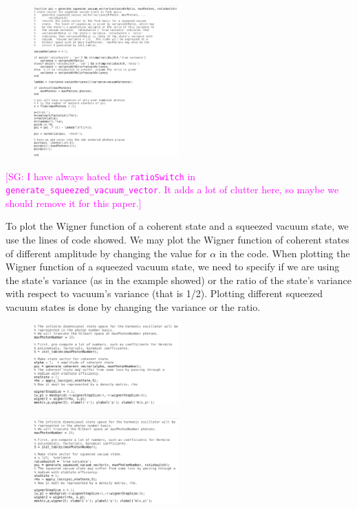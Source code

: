 \documentclass[twocolumn]{rbef}
\providecommand{\aucmnt}[1]{#1}
\providecommand{\editcolor}[2]{\textcolor{#1}{#2}}
\providecommand{\aucmnt}[1]{}
\providecommand{\editcolor}[2]{#2}
\newcommand{\SGc}[1]{\aucmnt{\editcolor{magenta}{[SG: #1]}}}
\begin{document}
\begin{figure}[h]
\includegraphics[width=0.5\textwidth]{generate_squeezed_vacuum_vector.eps}
\end{figure}
\SGc{I have always hated the \texttt{ratioSwitch} in
  \texttt{generate\_squeezed\_vacuum\_vector}.  It adds a lot of
  clutter here, so maybe we should remove it for this paper.}

To plot the Wigner function of a coherent state and a squeezed vacuum state, we use the lines of code showed. We may plot the Wigner function of coherent states of different amplitude by changing the value for $\alpha$ in the code. When plotting the Wigner function of a squeezed vacuum state, we need to specify if we are using the state's variance (as in the example showed) or the ratio of the state's variance with
respect to vacuum's variance (that is 1/2). Plotting different squeezed vacuum states is done by changing the variance or the ratio.

\begin{figure}[h!]
\includegraphics[width=0.5\textwidth]{wigner-coherent-alpha=1.eps}
\end{figure}
 
\begin{figure}[h!]
\includegraphics[width=0.5\textwidth]{wigner-squeezed.eps}
\end{figure}
\end{document}
